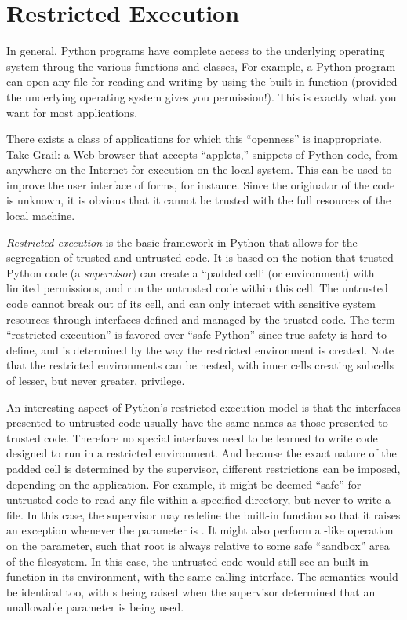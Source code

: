 \chapter{Restricted Execution \label{restricted}}

In general, Python programs have complete access to the underlying
operating system throug the various functions and classes, For
example, a Python program can open any file for reading and writing by
using the  built-in function (provided the underlying
operating system gives you permission!).  This is exactly what you want
for most applications.

There exists a class of applications for which this ``openness'' is
inappropriate.  Take Grail: a Web browser that accepts ``applets,''
snippets of Python code, from anywhere on the Internet for execution
on the local system.  This can be used to improve the user interface
of forms, for instance.  Since the originator of the code is unknown,
it is obvious that it cannot be trusted with the full resources of the
local machine.

\emph{Restricted execution} is the basic framework in Python that allows
for the segregation of trusted and untrusted code.  It is based on the
notion that trusted Python code (a \emph{supervisor}) can create a
``padded cell' (or environment) with limited permissions, and run the
untrusted code within this cell.  The untrusted code cannot break out
of its cell, and can only interact with sensitive system resources
through interfaces defined and managed by the trusted code.  The term
``restricted execution'' is favored over ``safe-Python''
since true safety is hard to define, and is determined by the way the
restricted environment is created.  Note that the restricted
environments can be nested, with inner cells creating subcells of
lesser, but never greater, privilege.

An interesting aspect of Python's restricted execution model is that
the interfaces presented to untrusted code usually have the same names
as those presented to trusted code.  Therefore no special interfaces
need to be learned to write code designed to run in a restricted
environment.  And because the exact nature of the padded cell is
determined by the supervisor, different restrictions can be imposed,
depending on the application.  For example, it might be deemed
``safe'' for untrusted code to read any file within a specified
directory, but never to write a file.  In this case, the supervisor
may redefine the built-in  function so that it raises
an exception whenever the  parameter is .  It
might also perform a -like operation on the
 parameter, such that root is always relative to some
safe ``sandbox'' area of the filesystem.  In this case, the untrusted
code would still see an built-in  function in its
environment, with the same calling interface.  The semantics would be
identical too, with s being raised when the
supervisor determined that an unallowable parameter is being used.

